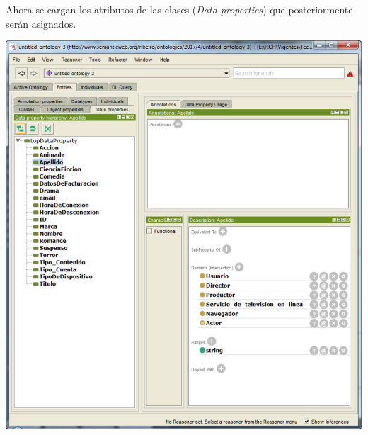 \documentclass[a4paper,10pt,spanish,oneside]{article}
\begin{document}
\begin{minipage}{0.3\linewidth}

Ahora se cargan los atributos de las clases (\textit{Data properties}) que posteriormente serán asignados.

\end{minipage} \hfill \begin{minipage}{0.65\linewidth}

\begin{center}
\includegraphics[width=\linewidth]{3}
\end{center}

\end{minipage}
\end{document}
